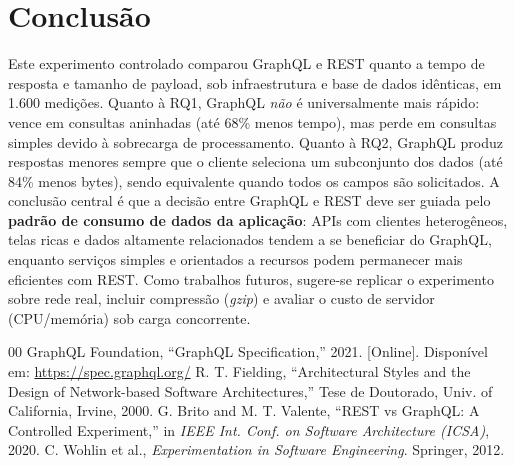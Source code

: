 \documentclass[conference]{IEEEtran}
\begin{document}
\section{Conclusão}
Este experimento controlado comparou GraphQL e REST quanto a tempo de resposta
e tamanho de payload, sob infraestrutura e base de dados idênticas, em 1.600
medições. Quanto à RQ1, GraphQL \emph{não} é universalmente mais rápido: vence
em consultas aninhadas (até 68\% menos tempo), mas perde em consultas simples
devido à sobrecarga de processamento. Quanto à RQ2, GraphQL produz respostas
menores sempre que o cliente seleciona um subconjunto dos dados (até 84\% menos
bytes), sendo equivalente quando todos os campos são solicitados. A conclusão
central é que a decisão entre GraphQL e REST deve ser guiada pelo
\textbf{padrão de consumo de dados da aplicação}: APIs com clientes
heterogêneos, telas ricas e dados altamente relacionados tendem a se beneficiar
do GraphQL, enquanto serviços simples e orientados a recursos podem permanecer
mais eficientes com REST. Como trabalhos futuros, sugere-se replicar o
experimento sobre rede real, incluir compressão (\textit{gzip}) e avaliar o
custo de servidor (CPU/memória) sob carga concorrente.

\begin{thebibliography}{00}
 GraphQL Foundation, ``GraphQL Specification,'' 2021.
[Online]. Disponível em: \url{https://spec.graphql.org/}
 R. T. Fielding, ``Architectural Styles and the Design of
Network-based Software Architectures,'' Tese de Doutorado, Univ. of California,
Irvine, 2000.
 G. Brito and M. T. Valente, ``REST vs GraphQL: A Controlled
Experiment,'' in \textit{IEEE Int. Conf. on Software Architecture (ICSA)}, 2020.
 C. Wohlin et al., \textit{Experimentation in Software
Engineering}. Springer, 2012.
\end{thebibliography}
\end{document}

